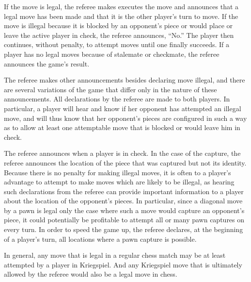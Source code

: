 \documentclass[times, 10pt,twocolumn]{article}
\begin{document}
If the move is legal, the referee makes executes the move and announces that a
legal move has been made and that it is the other player's turn to move.  If
the move is illegal because it is blocked by an opponent's piece or would place
or leave the active player in check, the referee announces, ``No.''  The player
then continues, without penalty, to attempt moves until one finally succeeds.
If a player has no legal moves because of stalemate or checkmate, the referee
announces the game's result.

The referee makes other announcements besides declaring move illegal, and there
are several variations of the game that differ only in the nature of these
announcements.  All declarations by the referee are made to both players.  In
particular, a player will hear and know if her opponent has attempted an
illegal move, and will thus know that her opponent's pieces are configured in
such a way as to allow at least one attemptable move that is blocked or would
leave him in check.  

The referee announces when a player is in check. In the case of the capture,
the referee announces the location of the piece that was captured but not its
identity.  Because there is no penalty for making illegal moves, it is often to
a player's advantage to attempt to make moves which are likely to be illegal,
as hearing such declarations from the referee can provide important information
to a player about the location of the opponent's pieces.  In particular, since
a diagonal move by a pawn is legal only the case where such a move would
capture an opponent's piece, it could potentially be profitable to attempt all
or many pawn captures on every turn.  In order to speed the game up, the
referee declares, at the beginning of a player's turn, all locations where a
pawn capture is possible. 

In general, any move that is legal in a regular chess match may be at least
attempted by a player in Kriegspiel.  And any Kriegspiel move that is
ultimately allowed by the referee would also be a legal move in chess.    
\end{document}
